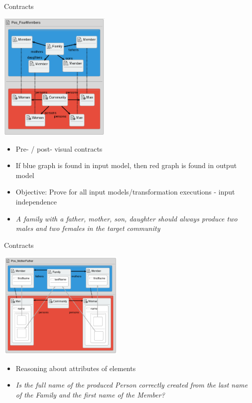 \documentclass[xcolor=dvipsnames, 12pt, handout]{beamer}
\begin{document}
\begin{frame}{Contracts}
\begin{center}
\includegraphics[width=0.40\textwidth]{figures/Pos_FourMembers}
\end{center}
\pause
\begin{itemize}[<+->]
\item Pre- / post- visual contracts
\item If blue graph is found in input model, then red graph is found in output model
\item Objective: Prove for all input models/transformation executions - input independence
\item \textit{A family with a father, mother, son, daughter
should always produce two males and two females in the
target community}
\end{itemize}
\end{frame}


\begin{frame}{Contracts}
\begin{center}
\includegraphics[width=0.45\textwidth]{figures/Pos_MotherFather}
\end{center}
\pause
\begin{itemize}[<+->]
\item Reasoning about attributes of elements
\item \textit{Is the full name of the produced Person correctly created from the last name of the Family and the first name of the Member?}
\end{itemize}
\end{frame}
\end{document}

